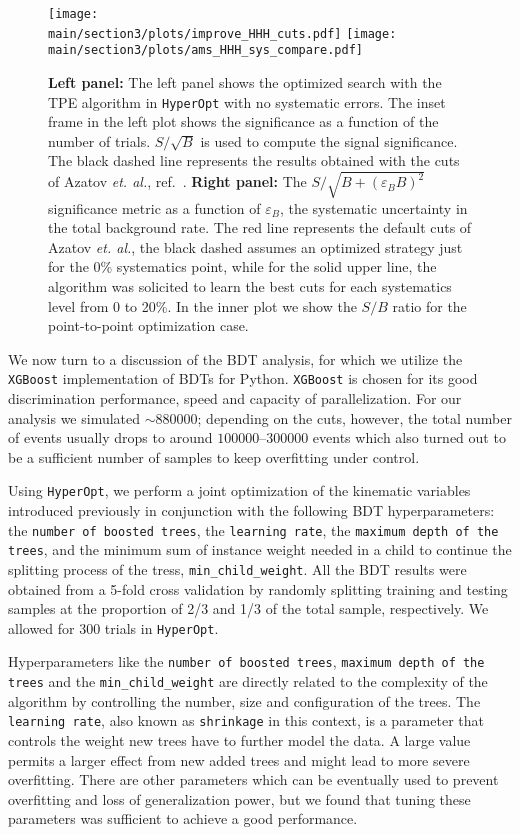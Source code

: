 \begin{figure}[!t]
\centering
\texttt{[image: \\main/section3/plots/improve\_HHH\_cuts.pdf]}
\texttt{[image: \\main/section3/plots/ams\_HHH\_sys\_compare.pdf]}
\caption{\textbf{Left panel:} The left panel shows the optimized search with the TPE algorithm in \texttt{HyperOpt} with no systematic errors. The inset frame in the left plot shows the significance as a function of the number of trials. $S/\sqrt{B}$ is used to compute the signal significance. The black dashed line represents the results obtained with the cuts of Azatov \emph{et. al.}, ref.~\cite{Azatov:2015oxa}. \textbf{Right panel:} The $S/\sqrt{B+(\varepsilon_B B)^2}$ significance metric as a  function of $\varepsilon_B$, the systematic uncertainty in the total background rate. The red line represents the default cuts of Azatov \emph{et. al.}, the black dashed assumes an optimized strategy just for the 0\% systematics point, while for the solid upper line, the algorithm was solicited to learn the best cuts for each systematics level from 0 to 20\%. In the inner plot we show the $S/B$ ratio for the point-to-point optimization case. }
\label{fig:BayesianKS}
\end{figure}
%



We now turn to a discussion of the BDT analysis, for which we utilize the \texttt{XGBoost}  implementation of BDTs for Python. \texttt{XGBoost} is chosen for its good discrimination performance, speed and capacity of parallelization.  For our  analysis we simulated $\sim 880000$; depending on the cuts, however, the total number of events usually drops to around $100000$--$300000$ events which also turned out to be a sufficient number of samples to keep overfitting under control.

Using \texttt{HyperOpt}, we perform a joint optimization of the kinematic variables introduced previously in conjunction with the following BDT hyperparameters: the \texttt{number of boosted trees}, the \texttt{learning rate}, the \texttt{maximum depth of the trees}, and the minimum sum of instance weight needed in a child to continue the splitting process of the tress, \texttt{min\_child\_weight}. All the BDT results were obtained from a 5-fold cross validation by randomly splitting training and testing samples at the proportion of 2/3 and 1/3 of the total sample, respectively. We allowed for 300 trials in \texttt{HyperOpt}. 

Hyperparameters like the \texttt{number of boosted trees}, \texttt{maximum depth of the trees} and the \texttt{min\_child\_weight} are directly related to the complexity of the algorithm by controlling the number, size and configuration of the trees. The \texttt{learning rate}, also known as \texttt{shrinkage} in this context, is a parameter that controls the weight new trees have to further model the data. A large value permits a larger effect from new added trees and might lead to more severe overfitting. There are other parameters which can be eventually used to prevent overfitting and loss of generalization power, but we found that tuning these parameters was sufficient to achieve a good performance.


